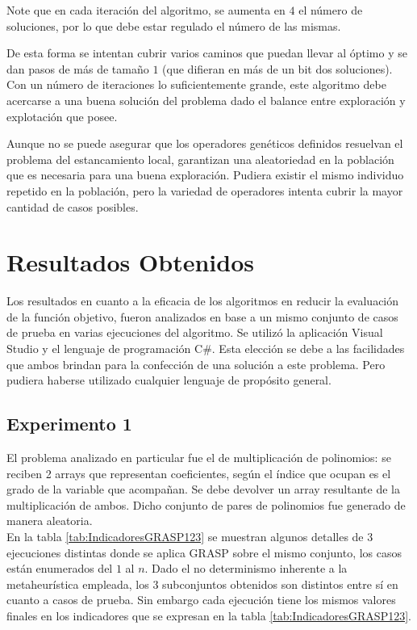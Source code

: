 \documentclass[a4paper,openright,11pt,oneside]{book}
\begin{document}
		Note que en cada iteración del algoritmo, se aumenta en $4$ el número de soluciones, por lo que debe estar regulado el número de las mismas.
	
		De esta forma se intentan cubrir varios caminos que puedan llevar al óptimo y se dan pasos de más de tamaño $1$ (que difieran en más de un bit dos soluciones). Con un número de iteraciones lo suficientemente grande, este algoritmo debe acercarse a una buena solución del problema dado el balance entre exploración y explotación que posee.
		
		Aunque no se puede asegurar que los operadores genéticos definidos resuelvan el problema del estancamiento local, garantizan una aleatoriedad en la población que es necesaria para una buena exploración. Pudiera existir el mismo individuo repetido en la población, pero la variedad de operadores intenta cubrir la mayor cantidad de casos posibles.
	
\chapter{Resultados Obtenidos}

	Los resultados en cuanto a la eficacia de los algoritmos en reducir la evaluación de la función objetivo, fueron analizados en base a un mismo conjunto de casos de prueba en varias ejecuciones del algoritmo. Se utilizó la aplicación Visual Studio y el lenguaje de programación C\#. Esta elección se debe a las facilidades que ambos brindan para la confección de una solución a este problema. Pero pudiera haberse utilizado cualquier lenguaje de propósito general. 
	
	\section{Experimento 1}
	El problema analizado en particular fue el de multiplicación de polinomios: se reciben 2 arrays que representan coeficientes, según el índice que ocupan es el grado de la variable que acompañan. Se debe devolver un array resultante de la multiplicación de ambos. Dicho conjunto de pares de polinomios fue generado de manera aleatoria. \\
	
	En la tabla \ref{tab:IndicadoresGRASP123} se muestran algunos detalles de 3 ejecuciones distintas donde se aplica GRASP sobre el mismo conjunto, los casos están enumerados del $1$ al $n$. Dado el no determinismo inherente a la metaheurística empleada, los 3 subconjuntos obtenidos son distintos entre sí en cuanto a casos de prueba. Sin embargo cada ejecución tiene los mismos valores finales en los indicadores que se expresan en la tabla \ref{tab:IndicadoresGRASP123}.
	
\end{document}
